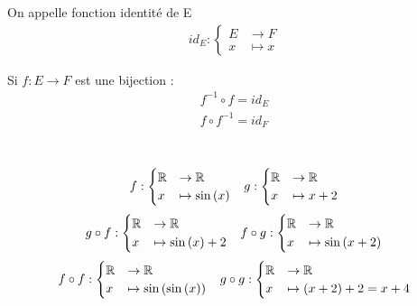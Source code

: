 \begin{graybox}
	\begin{definition}
		On appelle fonction identité de E
		\begin{align*}
			id_E :
			\begin{cases}
				E &\to F \\
				x &\mapsto x
			\end{cases}
		\end{align*}
	\end{definition}
\end{graybox}

\begin{graybox}
	\begin{proposition}[]
		Si $f: E \to F$ est une bijection :
		\begin{align*}
			f^{-1} \circ f = id_E \\
			f \circ f^{-1} = id_F
		\end{align*}
	\end{proposition}
\end{graybox}

\begin{exemple}~
	\begin{align*}
		&f :
		\begin{cases}
			\mathbb{R} &\to \mathbb{R} \\
			x &\mapsto \sin{(x)}
		\end{cases}
		&g :
		\begin{cases}
			\mathbb{R} &\to \mathbb{R} \\
			x &\mapsto x + 2
		\end{cases}
	\end{align*}
	\begin{align*}
		&g \circ f :
		\begin{cases}
			\mathbb{R} &\to \mathbb{R} \\
			x &\mapsto \sin{(x)} + 2
		\end{cases}
		&f \circ g :
		\begin{cases}
			\mathbb{R} &\to \mathbb{R} \\
			x &\mapsto \sin{(x + 2)}
		\end{cases}
	\end{align*}
	\begin{align*}
		&f \circ f :
		\begin{cases}
			\mathbb{R} &\to \mathbb{R} \\
			x &\mapsto \sin{(\sin{(x)})}
		\end{cases}
		&g \circ g :
		\begin{cases}
			\mathbb{R} &\to \mathbb{R} \\
			x &\mapsto (x + 2) + 2 = x + 4
		\end{cases}
	\end{align*}
\end{exemple}


